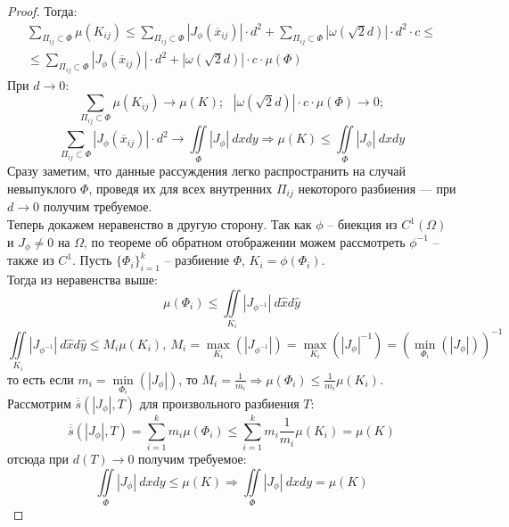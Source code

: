 \begin{proof}
    Тогда:
    \begin{multline*}
        \sum\limits_{\Pi_{ij}\subset\Phi} \mu(K_{ij}) \leqslant \sum\limits_{\Pi_{ij}\subset\Phi} |J_\phi(\overline{x}_{ij})|\cdot d^2 + \sum\limits_{\Pi_{ij}\subset\Phi} |\omega(\sqrt{2}d)| \cdot d^2\cdot c \leqslant \\ \leqslant\sum\limits_{\Pi_{ij}\subset\Phi} |J_\phi(\overline{x}_{ij})|\cdot d^2 + |\omega(\sqrt{2}d)|\cdot c \cdot \mu(\Phi)
    \end{multline*}
    При $d \rightarrow 0$:
    \[\sum\limits_{\Pi_{ij}\subset\Phi} \mu(K_{ij}) \rightarrow \mu(K); \ \ \ |\omega(\sqrt{2}d)|\cdot c \cdot \mu(\Phi) \rightarrow 0; \]\[ \sum\limits_{\Pi_{ij}\subset\Phi} |J_\phi(\overline{x}_{ij})|\cdot d^2 \rightarrow \iint\limits_\Phi |J_\phi|\ dxdy \Longrightarrow \mu(K) \leqslant \iint\limits_\Phi |J_\phi|\ dxdy\]
    Сразу заметим, что данные рассуждения легко распространить на случай невыпуклого $\Phi$, проведя их для всех внутренних $\Pi_{ij}$ некоторого разбиения --- при $d\rightarrow 0$ получим требуемое.\\
    Теперь докажем неравенство в другую сторону. Так как $\phi$ -- биекция из $C^1(\Omega)$ и $J_\phi \neq 0$ на $\Omega$, по теореме об обратном отображении можем рассмотреть $\phi^{-1}$ -- также из $C^1$. Пусть $\{\Phi_i\}_{i=1}^k$ -- разбиение $\Phi$, $K_i = \phi(\Phi_i)$. \\
    Тогда из неравенства выше:
    \[\mu(\Phi_i) \leqslant \iint\limits_{K_i} |J_{\phi^{-1}}|\ d\hat{x}d\hat{y}\] \[\iint\limits_{K_i} |J_{\phi^{-1}}|\ d\hat{x}d\hat{y} \leqslant M_i \mu(K_i), \ M_i = \max\limits_{K_i}(|J_{\phi^{-1}}|) = \max\limits_{K_i}(|J_{\phi}|^{-1}) = (\min\limits_{\Phi_i}(|J_{\phi}|))^{-1}\]
    то есть если $m_i = \min\limits_{\Phi_i}(|J_{\phi}|)$, то $M_i = \frac{1}{m_i} \Longrightarrow \mu(\Phi_i) \leqslant \frac{1}{m_i}\mu(K_i)$.\\
    Рассмотрим $\overline{\overline{s}}(|J_{\phi}|, T)$ для произвольного разбиения $T$:
    \[\overline{\overline{s}}(|J_{\phi}|, T) = \sum\limits_{i=1}^k m_i\mu(\Phi_i) \leqslant \sum\limits_{i=1}^k m_i\frac{1}{m_i}\mu(K_i) = \mu(K)\]
    отсюда при $d(T) \rightarrow 0$ получим требуемое:
    \[\iint\limits_\Phi |J_\phi|\ dxdy \leqslant \mu(K) \Longrightarrow \iint\limits_\Phi |J_\phi|\ dxdy = \mu(K)\]
\end{proof}
